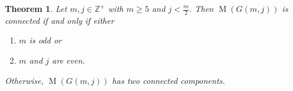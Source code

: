 \documentclass[12pt]{amsart}
\newtheorem{theorem}{Theorem}[section]
\theoremstyle{definition}
\theoremstyle{remark}
\numberwithin{equation}{section}
\numberwithin{figure}{section}
\newcommand{\M}{\operatorname{M}}
\newcommand{\Z}{\mathbb{Z}}
\begin{document}


\begin{theorem} \label{thm: G(m,j) connected}
    Let $m,j \in \Z^+$ with $m \geq 5$ and $j < \frac{m}{2}$. Then $\M(G(m,j))$ is connected if and only if either
    \begin{enumerate}
        \item $m$ is odd or
        \item $m$ and $j$ are even.
    \end{enumerate}
    Otherwise, $\M(G(m,j))$ has two connected components.
\end{theorem}
\end{document}
